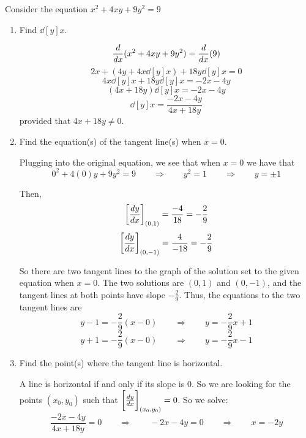 \documentclass[nooutcomes]{ximera}
\begin{document}
\begin{problem}
Consider the equation $x^2 + 4xy + 9y^2 = 9$

\begin{image}
\end{image}

	\begin{enumerate}
	
	\item  Find $\dd[y]{x}$.
		\begin{freeResponse}
		$$ \ddx(x^2 + 4xy + 9y^2) = \ddx(9) $$
		$$ 2x + \left(4y + 4x \dd[y]{x} \right) + 18 y \dd[y]{x} = 0 $$
		$$ 4x \dd[y]{x} + 18y \dd[y]{x} = -2x - 4y $$
		$$ (4x+18y) \dd[y]{x} = -2x-4y $$
		$$ \dd[y]{x} = \frac{-2x-4y}{4x+18y} $$
		provided that $4x+18y \neq 0$.
		\end{freeResponse}
		
		
		
	\item  Find the equation(s) of the tangent line(s) when $x=0$.
		\begin{freeResponse}
		Plugging into the original equation, we see that when $x=0$ we have that 
		$$ 0^2 + 4(0)y + 9y^2 = 9 \qquad \Longrightarrow \qquad y^2 = 1 \qquad \Longrightarrow \qquad y = \pm 1 $$
		
		Then,
		$$\eval{\dd[y]{x}}_{(0,1)} = \frac{-4}{18} = -\frac{2}{9}$$
		$$\eval{\dd[y]{x}}_{(0,-1)} = \frac{4}{-18} = -\frac{2}{9} $$
		
		So there are two tangent lines to the graph of the solution set to the given equation when $x=0$.  The two solutions are $(0,1)$ and $(0,-1)$, and the tangent lines at both points have slope $-\frac{2}{9}$.  Thus, the equations to the two tangent lines are
		$$ y - 1 = -\frac{2}{9}(x-0)  \qquad \Longrightarrow \qquad y = -\frac{2}{9}x + 1 $$
		$$ y + 1 = -\frac{2}{9}(x-0) \qquad \Longrightarrow \qquad y = -\frac{2}{9}x - 1 $$
		\end{freeResponse}
		
		
		
	\item  Find the point(s) where the tangent line is horizontal.
		\begin{freeResponse}
		A line is horizontal if and only if its slope is 0.  So we are looking for the points $(x_0,y_0)$ such that $\eval{\dd[y]{x}}_{(x_0,y_0)} = 0$.  So we solve:
		$$ \frac{-2x-4y}{4x+18y} = 0\qquad \Longrightarrow \qquad -2x - 4y = 0 \qquad \Longrightarrow \qquad x=-2y$$
		

\end{freeResponse}
\end{enumerate}
\end{problem}
\end{document}
